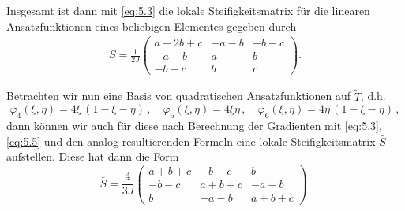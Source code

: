 Insgesamt ist dann mit \eqref{eq:5.3} die lokale Steifigkeitsmatrix für die linearen Ansatzfunktionen eines beliebigen Elementes gegeben durch
\begin{align*}
	S = \frac 1{2J}\begin{pmatrix}
				a+2b+c & -a-b & -b-c \\
				-a-b & a & b \\
				-b-c & b & c
			\end{pmatrix}.
\end{align*}

Betrachten wir nun eine Basis von quadratischen Ansatzfunktionen auf $\widetilde T$, d.h.
\[
	\varphi_4(\xi,\eta) = 4\xi \, (1-\xi-\eta) \, , \quad \varphi_5(\xi,\eta) = 4\xi\eta \, , \quad \varphi_6(\xi,\eta) = 4\eta\, (1-\xi-\eta) \, ,
\]
dann können wir auch für diese nach Berechnung der Gradienten mit \eqref{eq:5.3}, \eqref{eq:5.5} und den analog resultierenden Formeln eine lokale Steifigkeitsmatrix $\bar S$ aufstellen. Diese hat dann die Form
\[
	\bar S  = \frac 4{3J}\begin{pmatrix}
				a+b+c & -b-c & b \\
				-b-c & a+b+c & -a-b \\
				b & -a-b & a+b+c
			\end{pmatrix}.
\]

